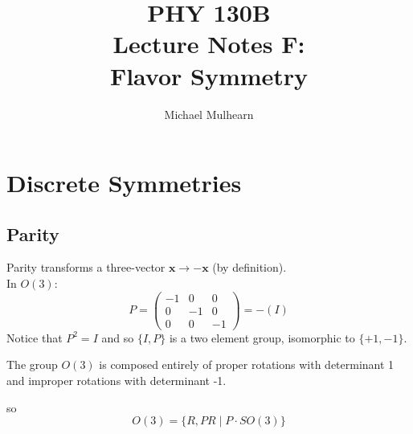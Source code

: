 \documentclass[12pt]{article}
\begin{document}
\title{PHY 130B \\ Lecture Notes F: \\
Flavor Symmetry\\}
\author{Michael Mulhearn}

\maketitle

\setcounter{exercise}{0}

\newcommand{\exercise}{
\stepcounter{exercise}
\noindent
{\bf Exercise F.\theexercise:}
}

\section{Discrete Symmetries}

\subsection*{Parity}

Parity transforms a three-vector $\mathbf{x} \to -\mathbf{x}$ (by definition).\\[6pt]
In $O(3)$:
\begin{equation*}
  P = \begin{pmatrix} -1 & 0 & 0 \\ 0 & -1 & 0 \\ 0 & 0 & -1 \end{pmatrix}
  = -(I)
\end{equation*}
Notice that $P^2=I$ and so $\{I, P\}$ is a two element group, isomorphic to $\{+1, -1\}$.

The group $O(3)$ is composed entirely of proper rotations with
determinant 1 and improper rotations with determinant -1.
\begin{center}
\end{center}
so
\begin{equation*}
  O(3) = \{R, PR \mid P \cdot SO(3)\}
\end{equation*}
\end{document}
